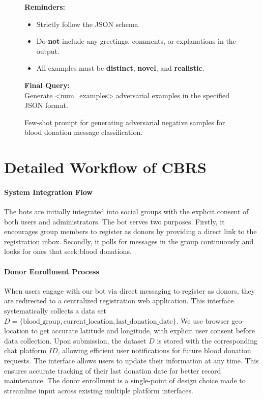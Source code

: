 \documentclass[11pt]{article}
\begin{document}
\begin{figure}[t]
\begin{tcolorbox}[title=\textbf{Few-shot Prompt Template for Adversarial Negative Sample Generation}, width=0.95\textwidth, colback=white]
\textbf{Reminders:}
\begin{itemize}
    \item Strictly follow the JSON schema.
    \item Do \textbf{not} include any greetings, comments, or explanations in the output.
    \item All examples must be \textbf{distinct}, \textbf{novel}, and \textbf{realistic}.
\end{itemize}

\vspace{0.3em}
\textbf{Final Query:} \\
Generate <num\_examples> adversarial examples in the specified JSON format.
\end{tcolorbox}
\caption{Few-shot prompt for generating adversarial negative samples for blood donation message classification.}
\label{fig:fewshot-adversarial-template}
\end{figure}




 
 
 \section{Detailed Workflow of CBRS} \label{workflow}
 \paragraph{System Integration Flow}
The bots are initially integrated into social groups with the explicit consent of both users and administrators. The bot serves two purposes. Firstly, it encourages group members to register as donors by providing a direct link to the registration inbox. Secondly, it polls for messages in the group continuously and looks for ones that seek blood donations.

\paragraph{Donor Enrollment Process}
When users engage with our bot via direct messaging to register as donors, they are redirected to a centralized registration web application. This interface systematically collects a data set \( D = \{ \text{blood\_group}, \text{current\_location}, \text{last\_donation\_date} \} \). We use browser geo-location to get accurate latitude and longitude, with explicit user consent before data collection. Upon submission, the dataset \( D \) is stored with the corresponding chat platform \( ID \), allowing efficient user notifications for future blood donation requests. The interface allows users to update their information at any time. This ensures accurate tracking of their last donation date for better record maintenance. The donor enrollment is a single-point of design choice made to streamline input across existing multiple platform interfaces.
\end{document}
